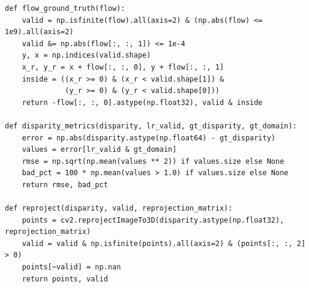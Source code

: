 \documentclass[a4paper,12pt]{article}
\begin{document}
\begin{lstlisting}
def flow_ground_truth(flow):
    valid = np.isfinite(flow).all(axis=2) & (np.abs(flow) <= 1e9).all(axis=2)
    valid &= np.abs(flow[:, :, 1]) <= 1e-4
    y, x = np.indices(valid.shape)
    x_r, y_r = x + flow[:, :, 0], y + flow[:, :, 1]
    inside = ((x_r >= 0) & (x_r < valid.shape[1]) &
              (y_r >= 0) & (y_r < valid.shape[0]))
    return -flow[:, :, 0].astype(np.float32), valid & inside

def disparity_metrics(disparity, lr_valid, gt_disparity, gt_domain):
    error = np.abs(disparity.astype(np.float64) - gt_disparity)
    values = error[lr_valid & gt_domain]
    rmse = np.sqrt(np.mean(values ** 2)) if values.size else None
    bad_pct = 100 * np.mean(values > 1.0) if values.size else None
    return rmse, bad_pct

def reproject(disparity, valid, reprojection_matrix):
    points = cv2.reprojectImageTo3D(disparity.astype(np.float32), reprojection_matrix)
    valid = valid & np.isfinite(points).all(axis=2) & (points[:, :, 2] > 0)
    points[~valid] = np.nan
    return points, valid
\end{lstlisting}

\clearpage
\end{document}
